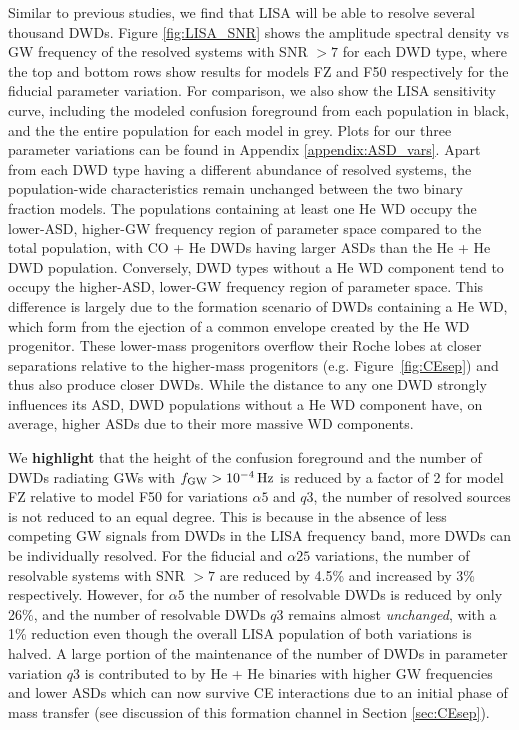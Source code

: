 \documentclass[twocolumn]{aastex631}
\begin{document}
Similar to previous studies, we find that LISA will be able to resolve several thousand DWDs. Figure \ref{fig:LISA_SNR} shows the amplitude spectral density vs GW frequency of the resolved systems with SNR $> 7$ for each DWD type, where the top and bottom rows show results for models FZ and F50 respectively for the fiducial parameter variation. For comparison, we also show the LISA sensitivity curve, including the 
modeled confusion foreground from each population in black, and the the entire population for each model in grey. Plots for our three parameter variations can be found in Appendix \ref{appendix:ASD_vars}. Apart from each DWD type having a different abundance of resolved systems, the population-wide characteristics remain unchanged between the two binary fraction models. The populations containing at least one He WD occupy the lower-ASD, higher-GW frequency region of parameter space compared to the total population, with CO + He DWDs having larger ASDs than the He + He DWD population. Conversely, DWD types without a He WD component tend to occupy the higher-ASD, lower-GW frequency region of parameter space. This difference is largely due to the formation scenario of DWDs containing a He WD, which form from the ejection of a common envelope created by the He WD progenitor. These lower-mass progenitors overflow their Roche lobes at closer separations relative to the higher-mass progenitors (e.g. Figure~\ref{fig:CEsep}) and thus also produce closer DWDs. While the distance to any one DWD strongly influences its ASD, DWD populations without a He WD component have, on average, higher ASDs due to their more massive WD components.


We \textbf{highlight} that the height of the confusion foreground and the number of DWDs radiating GWs with $f_{\rm{GW}} > 10^{-4}\,\rm{Hz}$ is reduced by a factor of 2 for model FZ relative to model F50 for variations $\alpha5$ and $q3$, the number of resolved sources is not reduced to an equal degree. This is because in the absence of less competing GW signals from DWDs in the LISA frequency band, more DWDs can be individually resolved. For the fiducial and $\alpha25$ variations, the number of resolvable systems with SNR $>7$ are reduced by 4.5\% and increased by 3\% respectively. However, for $\alpha5$ the number of resolvable DWDs is reduced by only 26\%, and the number of resolvable DWDs $q3$ remains almost \emph{unchanged}, with a 1\% reduction even though the overall LISA population of both variations is halved. A large portion of the maintenance of the number of DWDs in parameter variation $q3$ is contributed to by He + He binaries with higher GW frequencies and lower ASDs which can now survive CE interactions due to an initial phase of mass transfer (see discussion of this formation channel in Section \ref{sec:CEsep}).
\end{document}
